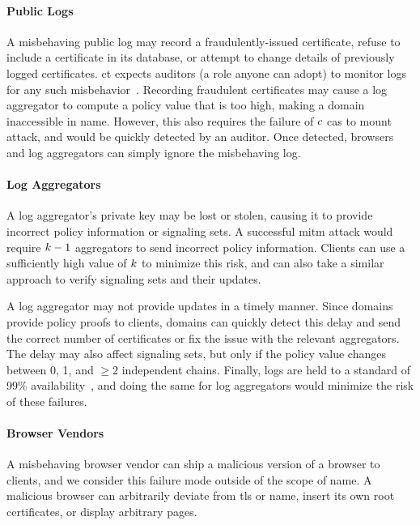 \paragraph{Public Logs}
A misbehaving public log may record a fraudulently-issued certificate, refuse
to include a certificate in its database, or attempt to change details of
previously logged certificates. \ac{ct} expects auditors (a role anyone can adopt) to
monitor logs for any such misbehavior~\cite{rfc6962}. 
Recording fraudulent certificates may cause a log
aggregator to compute a policy value that is too high, making a domain
inaccessible in \ac{name}. However, this also requires the failure of $c$
\acp{ca} to mount  attack, and would be quickly detected by an
auditor. Once detected, browsers and log aggregators can simply ignore the
misbehaving log.

\paragraph{Log Aggregators}
A log aggregator's private key may be lost or stolen, causing it to
provide incorrect policy information or signaling sets. A successful \ac{mitm}
attack would require $k - 1$ aggregators to send incorrect policy
information. Clients can use a sufficiently high value of $k$ to minimize
this risk, and can also take a similar approach to verify signaling sets and
their updates.

A log aggregator may not provide updates in a timely manner.
Since domains provide policy proofs to clients, domains can quickly detect this
delay and send the correct number of certificates or fix the issue with the
relevant aggregators. The delay may also affect signaling sets, but only if the
policy value changes between 0, 1, and $\ge 2$ independent chains. Finally,
logs are held to a standard of 99\% availability~\cite{ct-log-policy}, and doing the
same for log aggregators would minimize the risk of these failures.

\paragraph{Browser Vendors}
A misbehaving browser vendor can ship a malicious version of a browser to
clients, and we consider this failure mode outside of the scope of \ac{name}. A
malicious browser can arbitrarily deviate from \ac{tls} or \ac{name}, insert
its own root certificates, or display arbitrary pages. 

